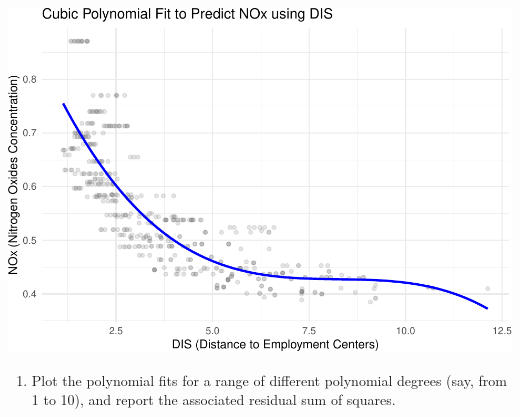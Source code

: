 \documentclass[
]{article}
\providecommand{\tightlist}{%
  \setlength{\itemsep}{0pt}\setlength{\parskip}{0pt}}
\begin{document}
\includegraphics{chapter-07-hw_files/figure-latex/unnamed-chunk-4-1.pdf}

\begin{enumerate}
\def\labelenumi{(\alph{enumi})}
\setcounter{enumi}{1}
\tightlist
\item
  Plot the polynomial fits for a range of different polynomial degrees
  (say, from 1 to 10), and report the associated residual sum of
  squares.
\end{enumerate}
\end{document}

